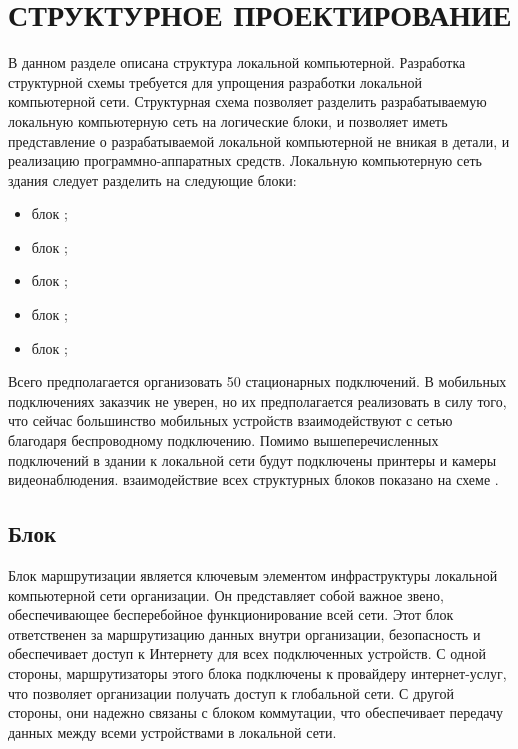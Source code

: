 \section{СТРУКТУРНОЕ ПРОЕКТИРОВАНИЕ}
\label{sec:sys}

В данном разделе описана структура локальной компьютерной. Разработка структурной схемы требуется 
для упрощения разработки локальной компьютерной сети. Структурная схема позволяет разделить
разрабатываемую локальную компьютерную сеть на логические блоки, и позволяет иметь представление о разрабатываемой 
локальной компьютерной не вникая в детали, и реализацию программно-аппаратных средств. Локальную компьютерную сеть 
здания следует разделить на следующие блоки:

\begin{itemize}
    \item блок \blockRoute@;
    \item блок \blockSwith@;
    \item блок \blockDevices@;
    \item блок \blockVideo@;
    \item блок \blockAccessPoint@;
\end{itemize}

Всего предполагается организовать 50 стационарных подключений. В мобильных подключениях заказчик не уверен, 
но их предполагается реализовать в силу того, что сейчас большинство мобильных устройств взаимодействуют с сетью благодаря 
беспроводному подключению. Помимо вышеперечисленных подключений в здании к локальной сети будут подключены принтеры и камеры видеонаблюдения.
взаимодействие всех структурных блоков показано на схеме \structScheme.

\subsection{Блок \blockRoute}   

Блок маршрутизации является ключевым элементом инфраструктуры локальной компьютерной сети организации. Он представляет собой важное звено, 
обеспечивающее бесперебойное функционирование всей сети. Этот блок ответственен за маршрутизацию данных внутри организации, безопасность и обеспечивает 
доступ к Интернету для всех подключенных устройств.
С одной стороны, маршрутизаторы этого блока подключены к провайдеру интернет-услуг, что позволяет организации получать доступ к глобальной сети. 
С другой стороны, они надежно связаны с блоком коммутации, что обеспечивает передачу данных между всеми устройствами в локальной сети.

